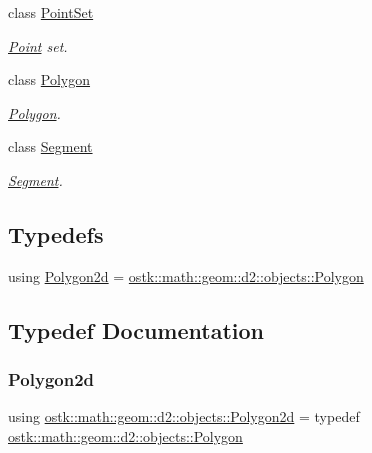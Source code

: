 \begin{DoxyCompactItemize}
class \hyperlink{classostk_1_1math_1_1geom_1_1d2_1_1objects_1_1_point_set}{Point\+Set}
\begin{DoxyCompactList}\small\item\em \hyperlink{classostk_1_1math_1_1geom_1_1d2_1_1objects_1_1_point}{Point} set. \end{DoxyCompactList}\item 
class \hyperlink{classostk_1_1math_1_1geom_1_1d2_1_1objects_1_1_polygon}{Polygon}
\begin{DoxyCompactList}\small\item\em \hyperlink{classostk_1_1math_1_1geom_1_1d2_1_1objects_1_1_polygon}{Polygon}. \end{DoxyCompactList}\item 
class \hyperlink{classostk_1_1math_1_1geom_1_1d2_1_1objects_1_1_segment}{Segment}
\begin{DoxyCompactList}\small\item\em \hyperlink{classostk_1_1math_1_1geom_1_1d2_1_1objects_1_1_segment}{Segment}. \end{DoxyCompactList}\end{DoxyCompactItemize}
\subsection*{Typedefs}
\begin{DoxyCompactItemize}
\item 
using \hyperlink{namespaceostk_1_1math_1_1geom_1_1d2_1_1objects_a5786a3021d23f9c64937e263a2da9d27}{Polygon2d} = \hyperlink{classostk_1_1math_1_1geom_1_1d2_1_1objects_1_1_polygon}{ostk\+::math\+::geom\+::d2\+::objects\+::\+Polygon}
\end{DoxyCompactItemize}


\subsection{Typedef Documentation}
\mbox{\label{namespaceostk_1_1math_1_1geom_1_1d2_1_1objects_a5786a3021d23f9c64937e263a2da9d27}} 
\subsubsection{\texorpdfstring{Polygon2d}{Polygon2d}}
{\footnotesize\ttfamily using \hyperlink{namespaceostk_1_1math_1_1geom_1_1d2_1_1objects_a5786a3021d23f9c64937e263a2da9d27}{ostk\+::math\+::geom\+::d2\+::objects\+::\+Polygon2d} = typedef \hyperlink{classostk_1_1math_1_1geom_1_1d2_1_1objects_1_1_polygon}{ostk\+::math\+::geom\+::d2\+::objects\+::\+Polygon}}

